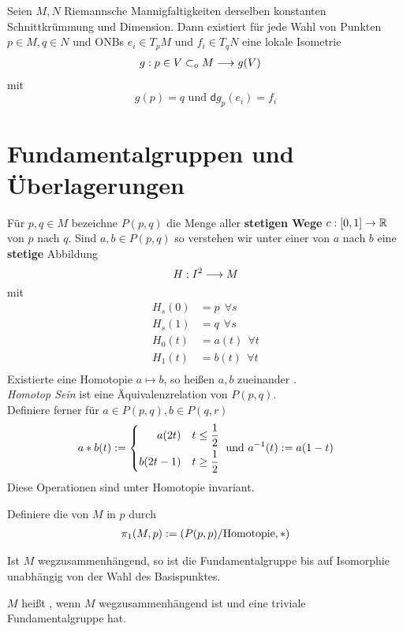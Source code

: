 \documentclass{book}
\renewcommand{\d}{\textsf{d}}
\begin{document}
\Kor{}
Seien $M,N$ Riemannsche Mannigfaltigkeiten derselben konstanten Schnittkrümmung und Dimension. Dann existiert für jede Wahl von Punkten $p\in M, q\in N$ und ONBs $e_i \in T_pM$ und $f_i \in T_qN$ eine lokale Isometrie
\begin{align*}
g : p\in V\subset_oM &\overset{}{\longrightarrow} g(V)
\end{align*}
mit
\[ g(p) = q \text{ und } \d g_p(e_i) = f_i \]

\newpage
\section{Fundamentalgruppen und Überlagerungen}
\Def{}
Für $p,q \in M$ bezeichne $P(p,q)$ die Menge aller \textbf{stetigen Wege} $c : [0,1] \overset{}{\rightarrow} \mathbb{R}$ von $p$ nach $q$. Sind $a,b \in P(p,q)$ so verstehen wir unter einer  von $a$ nach $b$ eine \textbf{stetige} Abbildung
\[ H : I^2 \overset{}{\longrightarrow} M \]
mit
\begin{align*}
H_s(0) &= p~~ \forall s\\
H_s(1) &= q~~ \forall s\\
H_0(t) &= a(t)~~ \forall t\\
H_1(t) &= b(t)~~ \forall t\\
\end{align*}
Existierte eine Homotopie $a\mapsto b$, so heißen $a,b$ zueinander .\\
\textit{Homotop Sein} ist eine Äquivalenzrelation von $P(p,q)$.\\
Definiere ferner für $a \in P(p,q), b \in P(q,r)$
\begin{align*}
a * b(t) := \left\lbrace
\begin{aligned}
a(2t) && t \leq \frac{1}{2}\\
b(2t - 1) && t \geq \frac{1}{2}
\end{aligned}
\right.
\text{ und }
a^{-1}(t) := a(1-t)
\end{align*} 
Diese Operationen sind unter Homotopie invariant.

Definiere die  von $M$ in $p$ durch
\begin{align*}
\pi_1(M,p) := \left(P(p,p) / \text{Homotopie}, *\right)
\end{align*}

\Bem{}
Ist $M$ wegzusammenhängend, so ist die Fundamentalgruppe bis auf Isomorphie unabhängig von der Wahl des Basispunktes.

\Def{}
$M$ heißt , wenn $M$ wegzusammenhängend ist und eine triviale Fundamentalgruppe hat.
\end{document}
